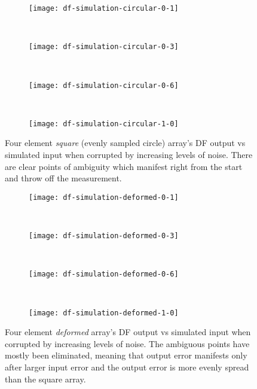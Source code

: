\begin{figure}
  \begin{subfigure}{\textwidth}
    \centering
    \texttt{[image: df-simulation-circular-0-1]}
  \end{subfigure}\\[1em]
  \begin{subfigure}{\textwidth}
    \centering
    \texttt{[image: df-simulation-circular-0-3]}
  \end{subfigure}\\[1em]
  \begin{subfigure}{\textwidth}
    \centering
    \texttt{[image: df-simulation-circular-0-6]}
  \end{subfigure}\\[1em]
  \begin{subfigure}{\textwidth}
    \centering
    \texttt{[image: df-simulation-circular-1-0]}
  \end{subfigure}
  \caption{Four element \emph{square} (evenly sampled circle) array's DF output vs simulated input when corrupted by increasing levels of noise. There are clear points of ambiguity which manifest right from the start and throw off the measurement.}
  \label{fig:rf-front-end:circular-error-snapshots}
\end{figure}

\begin{figure}
  \begin{subfigure}{\textwidth}
    \centering
    \texttt{[image: df-simulation-deformed-0-1]}
  \end{subfigure}\\[1em]
  \begin{subfigure}{\textwidth}
    \centering
    \texttt{[image: df-simulation-deformed-0-3]}
  \end{subfigure}\\[1em]
  \begin{subfigure}{\textwidth}
    \centering
    \texttt{[image: df-simulation-deformed-0-6]}
  \end{subfigure}\\[1em]
  \begin{subfigure}{\textwidth}
    \centering
    \texttt{[image: df-simulation-deformed-1-0]}
  \end{subfigure}
  \caption{Four element \emph{deformed} array's DF output vs simulated input when corrupted by increasing levels of noise. The ambiguous points have mostly been eliminated, meaning that output error manifests only after larger input error and the output error is more evenly spread than the square array.}
  \label{fig:rf-front-end:deformed-error-snapshots}
\end{figure}
